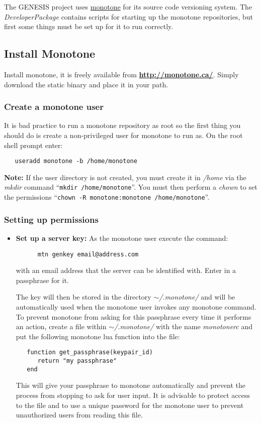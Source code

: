 \documentclass[12pt]{article}
\begin{document}
The GENESIS project uses \href{http://www.monotone.ca/}{monotone} for its source code versioning system. The {\it DeveloperPackage} contains scripts for starting up the monotone repositories, but first some things must be set up for it to run correctly.

\subsection*{Install Monotone}

Install monotone, it is freely available from \href{http://monotone.ca/}{\bf http://monotone.ca/}. Simply download the static binary and place it in your path.

\subsubsection*{Create a monotone user}

It is bad practice to run a monotone repository as root so the first thing you should do is create a non-privileged user for monotone to run as. On the root shell prompt enter:
\begin{verbatim}
   useradd monotone -b /home/monotone
\end{verbatim}
{\bf Note:} If the user directory is not created, you must create it in  {\it /home} via the {\it mkdir} command ``{\tt mkdir /home/monotone}''. You must then perform a {\it chown} to set the permissions ``{\tt chown -R monotone:monotone /home/monotone}''.

\subsubsection*{Setting up permissions}

\begin{itemize}
   \item[]{\bf Set up a server key:} As the monotone user execute the command:
   \begin{verbatim}
      mtn genkey email@address.com
   \end{verbatim}
with an email address that the server can be identified with. Enter in a passphrase for it.

The key will then be stored in the directory {\it $\sim$/.monotone/}
and will be automatically used when the monotone user invokes any
monotone command. To prevent monotone from asking for this passphrase
every time it performs an action, create a file within {\it
  $\sim$/.monotone/} with the name {\it monotonerc} and put the
following monotone lua function into the file:
\begin{verbatim}
   function get_passphrase(keypair_id)
      return "my passphrase"
   end
\end{verbatim}
This will give your passphrase to monotone automatically and prevent
the process from stopping to ask for user input. It is advisable to
protect access to the file and to use a unique password for the
monotone user to prevent unauthorized users from reading this file.
\end{itemize}
\end{document}
